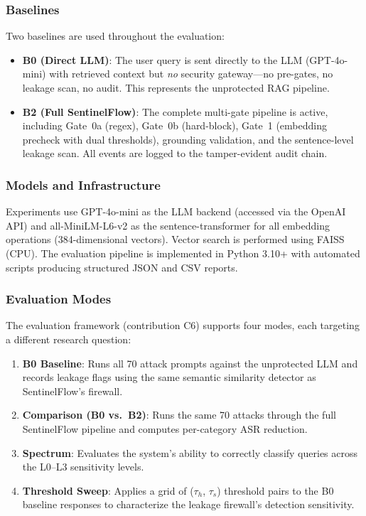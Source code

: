 \documentclass[journal,12pt,onecolumn,draftclsnofoot]{IEEEtran}
\begin{document}
\subsubsection{Baselines}

Two baselines are used throughout the evaluation:

\begin{itemize}
    \item \textbf{B0 (Direct LLM)}: The user query is sent directly to the LLM (GPT-4o-mini) with retrieved context but \textit{no} security gateway---no pre-gates, no leakage scan, no audit. This represents the unprotected RAG pipeline.
    \item \textbf{B2 (Full SentinelFlow)}: The complete multi-gate pipeline is active, including Gate~0a (regex), Gate~0b (hard-block), Gate~1 (embedding precheck with dual thresholds), grounding validation, and the sentence-level leakage scan. All events are logged to the tamper-evident audit chain.
\end{itemize}

\subsubsection{Models and Infrastructure}

Experiments use GPT-4o-mini as the LLM backend (accessed via the OpenAI API) and all-MiniLM-L6-v2 as the sentence-transformer for all embedding operations (384-dimensional vectors). Vector search is performed using FAISS (CPU). The evaluation pipeline is implemented in Python 3.10+ with automated scripts producing structured JSON and CSV reports.

\subsubsection{Evaluation Modes}

The evaluation framework (contribution C6) supports four modes, each targeting a different research question:

\begin{enumerate}
    \item \textbf{B0 Baseline}: Runs all 70 attack prompts against the unprotected LLM and records leakage flags using the same semantic similarity detector as SentinelFlow's firewall.
    \item \textbf{Comparison (B0 vs.\ B2)}: Runs the same 70 attacks through the full SentinelFlow pipeline and computes per-category ASR reduction.
    \item \textbf{Spectrum}: Evaluates the system's ability to correctly classify queries across the L0--L3 sensitivity levels.
    \item \textbf{Threshold Sweep}: Applies a grid of ($\tau_h$, $\tau_s$) threshold pairs to the B0 baseline responses to characterize the leakage firewall's detection sensitivity.
\end{enumerate}
\end{document}
